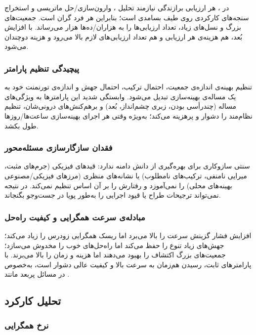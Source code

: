 در ، هر ارزيابی برازندگی نيازمند تحليل ، وارون‌سازی/حل ماتريسی و استخراج سنجه‌های کارکردی روی طيف بسامدی است؛ بنابراين هر فرد گران است. جمعيت‌های بزرگ و نسل‌های زياد، تعداد ارزيابی‌ها را به هزاران/ده‌ها هزار می‌رساند. با افزايش بُعد، هم هزينه‌ی هر ارزيابی و هم تعداد ارزيابی‌های لازم بالا می‌رود و هزينه دوچندان می‌شود.

\subsubsection{پيچيدگی تنظيم پارامتر}

تنظيم بهينه‌ی اندازه‌ی جمعيت، احتمال ترکيب، احتمال جهش و اندازه‌ی تورنمنت خود به يک مساله‌ی بهينه‌سازی تبديل می‌شود. وابستگی شديد اين پارامترها به ويژگی‌های مساله (چندرأسی بودن، زبری چشم‌انداز، بُعد) و برهم‌کنش‌های درونی‌شان، تنظيم نظام‌مند را دشوار و پرهزينه می‌کند؛ به‌ويژه وقتی هر اجرای بهينه‌سازی ساعت‌ها/روزها طول بکشد.

\subsubsection{فقدان سازگارسازی مسئله‌محور}

 سنتی سازوکاری برای بهره‌گيری از دانش دامنه ندارد: قيدهای فيزيکی (جرم‌های مثبت، ميرايی نامنفی، ترکيب‌های نامطلوب) يا نشانه‌های منظری (مرزهای فيزيکی/مصنوعی بهينه‌های محلی) را نمی‌آموزد و رفتارش را بر آن اساس تنظيم نمی‌کند. در نتيجه نمی‌تواند ترجيحات طراح يا قيود اجرايی را به‌طور پويا در جست‌وجو بگنجاند.

\subsubsection{مبادله‌ی سرعت همگرايی و کيفيت راه‌حل}

افزايش فشار گزينش سرعت را بالا می‌برد اما ريسک همگرايی زودرس را زياد می‌کند؛ جهش‌های زياد تنوع را حفظ می‌کند اما راه‌حل‌های خوب را مخدوش می‌سازد؛ جمعيت‌های بزرگ اکتشاف را بهبود می‌دهند اما هزينه و زمان را بالا می‌برند. با پارامترهای ثابت، رسيدن هم‌زمان به سرعت بالا و کيفيت عالی دشوار است، به‌خصوص در مسائل پربعد مانند .

\subsection{تحليل کارکرد}

\subsubsection{نرخ همگرايی}

